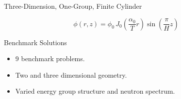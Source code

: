 \begin{frame}{Three-Dimension, One-Group, Finite Cylinder}
  \begin{figure}
    \centering
    \hspace{0.2in}
    \label{fig:finite_cyl}
  \end{figure}
  \vspace{-0.1in}
  \begin{equation}
    \label{eq:analytic_finite_cyl}
    \phi(r,z) = \phi_0 \, 
      J_0\left(\frac{\alpha_0}{T} r\right) \sin\left(\frac{\pi}{H} z \right)
  \end{equation}
\end{frame}

\begin{frame}{Benchmark Solutions}
  \begin{itemize}
    \item 9 benchmark problems.
    \item Two and three dimensional geometry.
    \item Varied energy group structure and neutron spectrum.
  \end{itemize}
  \begin{table}
    \begin{center}
    \end{center}
  \end{table}
\end{frame}

